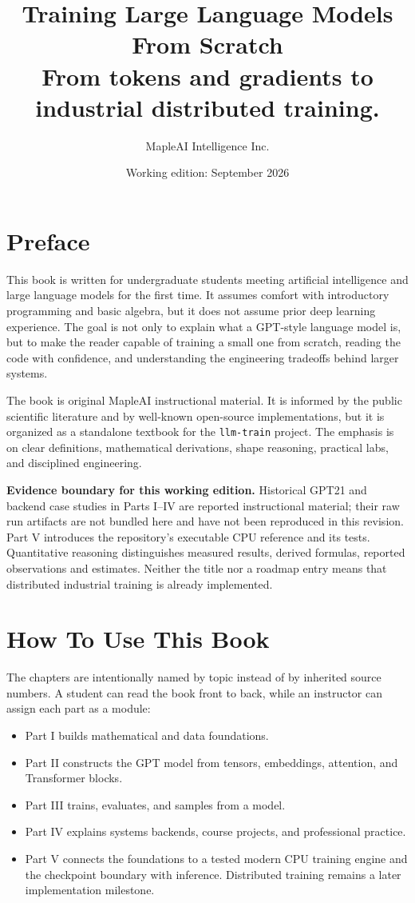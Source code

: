 \documentclass[11pt,oneside]{book}
\title{Training Large Language Models From Scratch\\\large From tokens and gradients to industrial distributed training.}
\author{MapleAI Intelligence Inc.}
\date{Working edition: September 2026}
\newcommand{\term}[1]{\textbf{#1}}
\begin{document}
\frontmatter
\maketitle
\tableofcontents

\chapter*{Preface}
This book is written for undergraduate students meeting artificial intelligence and large language models for the first time. It assumes comfort with introductory programming and basic algebra, but it does not assume prior deep learning experience. The goal is not only to explain what a GPT-style language model is, but to make the reader capable of training a small one from scratch, reading the code with confidence, and understanding the engineering tradeoffs behind larger systems.

The book is original MapleAI instructional material. It is informed by the public scientific literature and by well-known open-source implementations, but it is organized as a standalone textbook for the \texttt{llm-train} project. The emphasis is on clear definitions, mathematical derivations, shape reasoning, practical labs, and disciplined engineering.

\term{Evidence boundary for this working edition.} Historical GPT21 and backend
case studies in Parts I--IV are reported instructional material; their raw run
artifacts are not bundled here and have not been reproduced in this revision.
Part V introduces the repository's executable CPU reference and its tests.
Quantitative reasoning distinguishes measured results, derived formulas,
reported observations and estimates. Neither the title nor a roadmap entry
means that distributed industrial training is already implemented.

\chapter*{How To Use This Book}
The chapters are intentionally named by topic instead of by inherited source numbers. A student can read the book front to back, while an instructor can assign each part as a module:

\begin{itemize}
  \item Part I builds mathematical and data foundations.
  \item Part II constructs the GPT model from tensors, embeddings, attention, and Transformer blocks.
  \item Part III trains, evaluates, and samples from a model.
  \item Part IV explains systems backends, course projects, and professional practice.
  \item Part V connects the foundations to a tested modern CPU training engine and the checkpoint boundary with inference. Distributed training remains a later implementation milestone.
\end{itemize}
\end{document}
